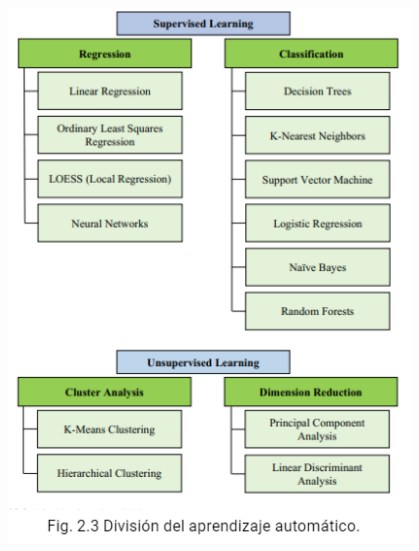 \documentclass[crop=false]{standalone}
\begin{document}
\begin{center}
\includegraphics[width=0.8\textwidth]{images/foto_texto_traducido_3.PNG}
\end{center}
\end{document}
